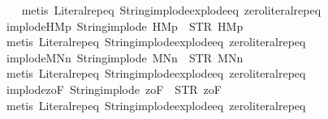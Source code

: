 \begin{isabellebody}
%
\isadelimproof
\ \ %
\endisadelimproof
%
\isatagproof
{}\isamarkupfalse%
\ {\isacharparenleft}metis\ Literal{\isachardot}rep{\isacharunderscore}eq\ String{\isachardot}implode{\isacharunderscore}explode{\isacharunderscore}eq\ zero{\isacharunderscore}literal{\isachardot}rep{\isacharunderscore}eq{\isacharparenright}%
\endisatagproof
{\isafoldproof}%
%
\isadelimproof
\isanewline
%
\endisadelimproof
\isanewline
{}\isamarkupfalse%
\ implode{\isacharunderscore}HM{}p{\isacharcolon}\ {\isachardoublequoteopen}String{\isachardot}implode\ {\isacharprime}{\isacharprime}HM{}p{\isacharprime}{\isacharprime}\ {\isacharequal}\ STR\ {\isacharprime}{\isacharprime}HM{}p{\isacharprime}{\isacharprime}{\isachardoublequoteclose}\isanewline
%
\isadelimproof
\ \ %
\endisadelimproof
%
\isatagproof
{}\isamarkupfalse%
\ {\isacharparenleft}metis\ Literal{\isachardot}rep{\isacharunderscore}eq\ String{\isachardot}implode{\isacharunderscore}explode{\isacharunderscore}eq\ zero{\isacharunderscore}literal{\isachardot}rep{\isacharunderscore}eq{\isacharparenright}%
\endisatagproof
{\isafoldproof}%
%
\isadelimproof
\isanewline
%
\endisadelimproof
\isanewline
{}\isamarkupfalse%
\ implode{\isacharunderscore}MNn{}{\isacharcolon}\ {\isachardoublequoteopen}String{\isachardot}implode\ {\isacharprime}{\isacharprime}MNn{}{\isacharprime}{\isacharprime}\ {\isacharequal}\ STR\ {\isacharprime}{\isacharprime}MNn{}{\isacharprime}{\isacharprime}{\isachardoublequoteclose}\isanewline
%
\isadelimproof
\ \ %
\endisadelimproof
%
\isatagproof
{}\isamarkupfalse%
\ {\isacharparenleft}metis\ Literal{\isachardot}rep{\isacharunderscore}eq\ String{\isachardot}implode{\isacharunderscore}explode{\isacharunderscore}eq\ zero{\isacharunderscore}literal{\isachardot}rep{\isacharunderscore}eq{\isacharparenright}%
\endisatagproof
{\isafoldproof}%
%
\isadelimproof
\isanewline
%
\endisadelimproof
\isanewline
{}\isamarkupfalse%
\ implode{\isacharunderscore}{}zoF{\isacharcolon}\ {\isachardoublequoteopen}String{\isachardot}implode\ {\isacharprime}{\isacharprime}{}zoF{\isacharprime}{\isacharprime}\ {\isacharequal}\ STR\ {\isacharprime}{\isacharprime}{}zoF{\isacharprime}{\isacharprime}{\isachardoublequoteclose}\isanewline
%
\isadelimproof
\ \ %
\endisadelimproof
%
\isatagproof
{}\isamarkupfalse%
\ {\isacharparenleft}metis\ Literal{\isachardot}rep{\isacharunderscore}eq\ String{\isachardot}implode{\isacharunderscore}explode{\isacharunderscore}eq\ zero{\isacharunderscore}literal{\isachardot}rep{\isacharunderscore}eq{\isacharparenright}%

\end{isabellebody}
